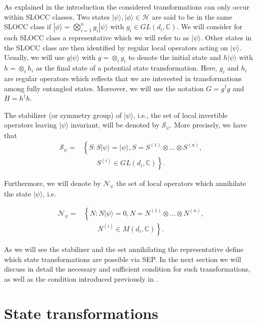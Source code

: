 \documentclass[superscriptaddress,twocolumn]{revtex4}\usepackage[utf8]{inputenc}
\newcommand{\ket}[1]{|#1\rangle}
\begin{document}
As explained in the introduction the considered transformations can only occur within SLOCC classes. Two states $|\psi\rangle,|\phi\rangle\in \mathcal{H}$ are said to be in the same SLOCC class if $|\phi\rangle=\bigotimes_{i=1}^ng_i|\psi\rangle$ with $g_i\in GL(d_i, \mathbb{C})$. We will consider for each SLOCC class a representative which we will refer to as $\ket{\psi}$. Other states in the SLOCC class are then identified by regular local operators acting on $\ket{\psi}$. Usually, we will use $ g \ket{\psi}$ with $g= \otimes_i g_i$  to denote the initial state and  $h \ket{\psi}$  with $h= \otimes_i h_i$ as the final state of a potential state transformation. Here, $g_i$ and $h_i$ are regular operators which reflects that we are interested in transformations among fully entangled states. Moreover, we will use the notation $G = g^\dagger g$ and $H = h^\dagger h$.

The stabilizer (or symmetry group) of $\ket{\psi}$, i.e., the set of local invertible operators leaving $\ket{\psi}$ invariant,  will be denoted by $\mathcal{S}_\psi$. More precisely, we have that
\begin{align}
\mathcal{S}_\psi = &\left\{ S : S\ket{\psi} = \ket{\psi}, S = S^{(1)} \otimes \ldots \otimes S^{(n)}, \right. \\ \nonumber
&\qquad \left. S^{(i)} \in GL(d_i, \mathbb{C}) \right\}.
\end{align}


Furthermore, we will denote by $\mathcal{N}_\psi$ the set of local operators which annihilate the state $\ket{\psi}$, i.e.

\begin{align}
\mathcal{N}_\psi = &\left\{ N : N\ket{\psi} = 0, N = N^{(1)} \otimes \ldots \otimes N^{(n)}, \right. \\ \nonumber
&\qquad \left. N^{(i)} \in M(d_i, \mathbb{C}) \right\}.
\end{align}

As we will see the stabilizer and the set annihilating the representative define which state transformations  are possible via SEP. In the next section we will discuss in detail the necessary and sufficient condition for such transformations, as well as the condition introduced previously in \cite{GoWa11}.


\section{State transformations}
\end{document}
